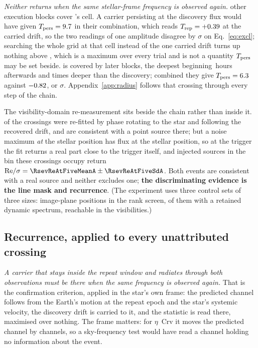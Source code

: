 \emph{Neither returns when the same stellar-frame frequency is observed
again.} \EvANRep{} other execution blocks cover \EvAStar's cell. A carrier
persisting at the discovery flux would have given $T_{\rm pers}=9.7$ in
their combination, which reads $T_{\rm rep}=+0.39$ at the carried drift, so
the two readings of one amplitude disagree by \EvAExcl$\sigma$ on
Eq.~\ref{eq:excl}; searching the whole grid at that cell instead of the one
carried drift turns up nothing above \EvATAnyDrift, which is a maximum over
every trial and is not a quantity $T_{\rm pers}$ may be set beside.
\EvBStar{} is covered by \RcCpNRep{} later blocks, the deepest beginning
\EvBNearH\,hours afterwards and \EvBDeepRatio{} times deeper than the
discovery; combined they give $T_{\rm pers}=6.3$ against $-0.82$,
or \EvBExcl$\sigma$. Appendix~\ref{app:radius} follows that crossing through
every step of the chain.

The visibility-domain re-measurement sits beside the chain rather than inside
it. \LgNFit{} of the \NCross{} crossings were re-fitted by phase rotating to
the star and following the recovered drift, and \LgNLocalCor{} are consistent
with a point source there; but a noise maximum \emph{at} the stellar position
has flux at the stellar position, so at the trigger the fit returns a real
part close to the trigger itself, and injected sources in the bin these
crossings occupy return
${\rm Re}/\sigma=\RsevReAtFiveMeanA\pm\RsevReAtFiveSdA$. Both events are
consistent with a real source and neither excludes one; \textbf{the
discriminating evidence is the line mask and recurrence}. (The experiment uses three control
sets of three sizes: \NCtrl{} image-plane positions in the rank screen,
\RcNRetCtrl{} of them with a retained dynamic spectrum, \RcNVisCtrl{}
reachable in the visibilities.)

\subsection{Recurrence, applied to every unattributed crossing}
\label{sec:etacrv}

\emph{A carrier that stays inside the repeat window and radiates through both
observations must be there when the same frequency is observed again.} That is
the confirmation criterion, applied in the star's own frame: the predicted
channel follows from the Earth's motion at the repeat epoch and the star's
systemic velocity, the discovery drift is carried to it, and the statistic is
read there, maximised over nothing. The frame matters: for $\eta$~Crv it moves
the predicted channel by \VnEcrDchan{} channels, so a sky-frequency test would
have read a channel holding no information about the event.

